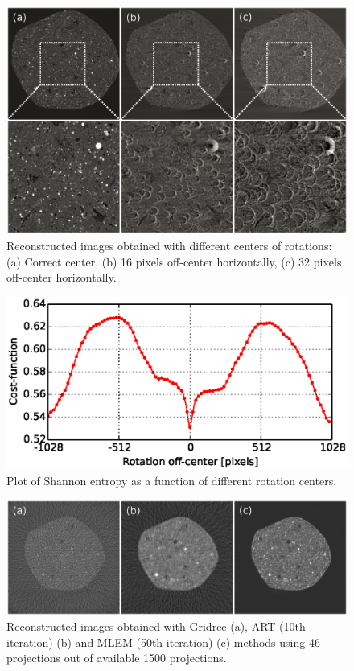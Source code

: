 \documentclass[pdf]{iucr}              %
\begin{document}
\begin{figure}
\centering
\includegraphics[width=\textwidth]{figs/center_optimize.eps}
\caption{Reconstructed images obtained with different centers of rotations: (a) Correct center, (b) 16 pixels  off-center horizontally, (c) 32 pixels off-center horizontally.}
\label{OptimizeCenter1}
\end{figure}

\begin{figure}
\centering
\includegraphics[width=\textwidth]{figs/center_costfunc.eps}
\caption{Plot of Shannon entropy as a function of different rotation centers. }
\label{fig:OptimizeCenter2}
\end{figure}


\begin{figure}
\centering
\includegraphics[width=\textwidth]{figs/recon_methods.eps}
\caption{Reconstructed images obtained with Gridrec (a), ART (10th iteration) (b) and MLEM (50th iteration) (c) methods using 46 projections out of available 1500 projections.}
\label{recon_methods}
\end{figure}
\end{document}
